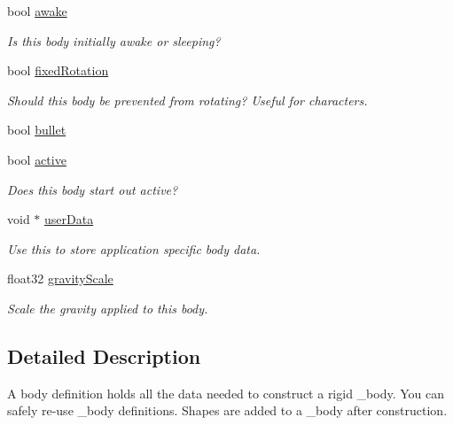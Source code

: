 \begin{DoxyCompactItemize}
bool \mbox{\hyperlink{structb2BodyDef_a17a8102638aac41e7ab94278651a45bd}{awake}}
\begin{DoxyCompactList}\small\item\em Is this body initially awake or sleeping? \end{DoxyCompactList}\item 
\mbox{\label{structb2BodyDef_a273a51c57440a8884de5939d76b6e3ea}} 
bool \mbox{\hyperlink{structb2BodyDef_a273a51c57440a8884de5939d76b6e3ea}{fixed\+Rotation}}
\begin{DoxyCompactList}\small\item\em Should this body be prevented from rotating? Useful for characters. \end{DoxyCompactList}\item 
bool \mbox{\hyperlink{structb2BodyDef_a7c0047c9a98a1d20614eeddcdbce7586}{bullet}}
\item 
\mbox{\label{structb2BodyDef_adf6f3e9a9e124e080c68bc0edeb170df}} 
bool \mbox{\hyperlink{structb2BodyDef_adf6f3e9a9e124e080c68bc0edeb170df}{active}}
\begin{DoxyCompactList}\small\item\em Does this body start out active? \end{DoxyCompactList}\item 
\mbox{\label{structb2BodyDef_ae457dd1d39be09945eace6061121be29}} 
void $\ast$ \mbox{\hyperlink{structb2BodyDef_ae457dd1d39be09945eace6061121be29}{user\+Data}}
\begin{DoxyCompactList}\small\item\em Use this to store application specific body data. \end{DoxyCompactList}\item 
\mbox{\label{structb2BodyDef_aadea3fa173ed1014739ec8b023de4336}} 
float32 \mbox{\hyperlink{structb2BodyDef_aadea3fa173ed1014739ec8b023de4336}{gravity\+Scale}}
\begin{DoxyCompactList}\small\item\em Scale the gravity applied to this body. \end{DoxyCompactList}\end{DoxyCompactItemize}


\subsection{Detailed Description}
A body definition holds all the data needed to construct a rigid _body. You can safely re-\/use _body definitions. Shapes are added to a _body after construction.

